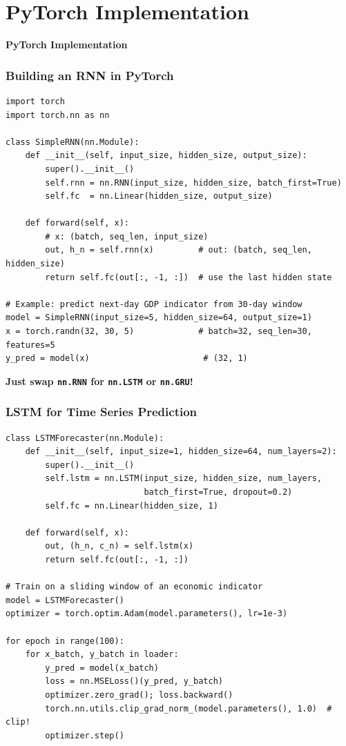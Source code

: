 \documentclass[notes,11pt, aspectratio=169]{beamer}
\newenvironment{transitionframe}{
  \setbeamercolor{background canvas}{bg=yellow}
  \begin{frame}}{
    \end{frame}
}
\begin{document}
\section{PyTorch Implementation}

\begin{transitionframe}
\begin{center}
{\Huge \textbf{PyTorch Implementation}}
\end{center}
\end{transitionframe}

\begin{frame}[fragile]
\frametitle{Building an RNN in PyTorch}

\begin{lstlisting}
import torch
import torch.nn as nn

class SimpleRNN(nn.Module):
    def __init__(self, input_size, hidden_size, output_size):
        super().__init__()
        self.rnn = nn.RNN(input_size, hidden_size, batch_first=True)
        self.fc  = nn.Linear(hidden_size, output_size)

    def forward(self, x):
        # x: (batch, seq_len, input_size)
        out, h_n = self.rnn(x)         # out: (batch, seq_len, hidden_size)
        return self.fc(out[:, -1, :])  # use the last hidden state

# Example: predict next-day GDP indicator from 30-day window
model = SimpleRNN(input_size=5, hidden_size=64, output_size=1)
x = torch.randn(32, 30, 5)             # batch=32, seq_len=30, features=5
y_pred = model(x)                       # (32, 1)
\end{lstlisting}

\vspace{4pt}
\textbf{Just swap \texttt{nn.RNN} for \texttt{nn.LSTM} or \texttt{nn.GRU}!}
\end{frame}

\begin{frame}[fragile]
\frametitle{LSTM for Time Series Prediction}

\begin{lstlisting}
class LSTMForecaster(nn.Module):
    def __init__(self, input_size=1, hidden_size=64, num_layers=2):
        super().__init__()
        self.lstm = nn.LSTM(input_size, hidden_size, num_layers,
                            batch_first=True, dropout=0.2)
        self.fc = nn.Linear(hidden_size, 1)

    def forward(self, x):
        out, (h_n, c_n) = self.lstm(x)
        return self.fc(out[:, -1, :])

# Train on a sliding window of an economic indicator
model = LSTMForecaster()
optimizer = torch.optim.Adam(model.parameters(), lr=1e-3)

for epoch in range(100):
    for x_batch, y_batch in loader:
        y_pred = model(x_batch)
        loss = nn.MSELoss()(y_pred, y_batch)
        optimizer.zero_grad(); loss.backward()
        torch.nn.utils.clip_grad_norm_(model.parameters(), 1.0)  # clip!
        optimizer.step()
\end{lstlisting}
\end{frame}
\end{document}
